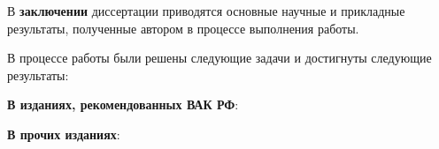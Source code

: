 \documentclass[a4paper]{G2-105}
\begin{document}
В \textbf{заключении} диссертации приводятся основные научные и прикладные результаты, полученные автором в процессе выполнения работы.


В процессе работы были решены следующие задачи и достигнуты следующие результаты:
\CommonResults

\clearpage


\renewcommand{\theenumi}{\arabic{enumi}}
\renewcommand{\labelenumi}{\theenumi.}

\textbf{В изданиях, рекомендованных ВАК РФ}:
\CommonPublicationsVAK{}

\textbf{В прочих изданиях}:
\CommonPublicationsOther{}
\end{document}
